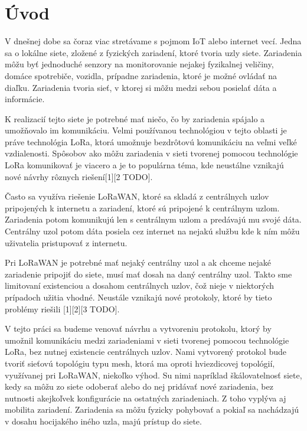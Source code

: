 \documentclass[slovak,master]{diploma}
\begin{document}
\MakeTitlePages

\listoffigures
\clearpage

\listoftables
\clearpage

\chapter{Úvod}
V dnešnej dobe sa čoraz viac stretávame s pojmom IoT alebo internet vecí. Jedna sa o lokálne siete, zložené z fyzických zariadení, ktoré tvoria uzly siete.
Zariadenia môžu byť jednoduché senzory na monitorovanie nejakej fyzikalnej veličiny, domáce spotrebiče, vozidla, prípadne 
zariadenia, ktoré je možné ovládať na diaľku. Zariadenia tvoria sieť, v ktorej si môžu medzi sebou posielať 
dáta a informácie.

K realizacií tejto siete je potrebné mať niečo, čo by zariadenia spájalo a umožňovalo im komunikáciu. Velmi používanou technológiou
v tejto oblasti je práve technológia LoRa, ktorá umožnuje bezdrôtovú komunikáciu na veľmi veľké vzdialenosti. Spôsobov ako môžu zariadenia 
v sieti tvorenej pomocou technológie LoRa komunikovať je viacero a je to populárna téma, kde neustálne vznikajú nové návrhy rôznych riešení[1][2 TODO].

Často sa využíva riešenie LoRaWAN, ktoré sa skladá z centrálnych uzlov pripojených k internetu a zariadení, ktoré sú pripojené k centrálnym uzlom. 
Zariadenia potom komunikujú len s centrálnym uzlom a predávajú mu svojé dáta. Centrálny uzol potom dáta posiela cez internet na nejakú službu kde 
k ním môžu uživatelia pristupovať z internetu.

Pri LoRaWAN je potrebné mať nejaký centrálny uzol a ak chceme nejaké zariadenie pripojiť do siete, musí mať dosah na daný centrálny uzol. 
Takto sme limitovaní existenciou a dosahom centrálnych uzlov, čož nieje v niektorých prípadoch užitia vhodné. Neustále vznikajú nové 
protokoly, ktoré by tieto problémy riešili [1][2][3 TODO]. %

V tejto práci sa budeme venovať návrhu a vytvoreniu protokolu, ktorý by umožnil komunikáciu medzi zariadeniami v sieti tvorenej pomocou technológie LoRa,
bez nutnej existencie centrálnych uzlov. Nami vytvorený protokol bude tvoriť sieťovú topológiu typu mesh, ktorá ma oproti hviezdicovej topológií, 
využívanej pri LoRaWAN, niekoľko výhod. Su nimi napríklad škálovatelnosť siete, kedy sa môžu zo siete odoberať alebo do nej pridávať nové zariadenia, 
bez nutnosti akejkoľvek konfigurácie na ostatných zariadeniach. Z toho vyplýva aj mobilita zariadení. Zariadenia sa môžu fyzicky pohybovať a 
pokiaľ sa nachádzajú v dosahu hocijakého iného uzla, majú prístup do siete.
\end{document}
